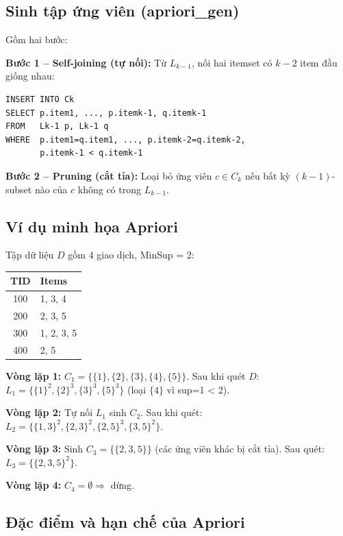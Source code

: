 \documentclass[10pt]{article}
\begin{document}
\subsection{Sinh tập ứng viên (apriori\_gen)}

Gồm hai bước:

\textbf{Bước 1 -- Self-joining (tự nối):} Từ $L_{k-1}$, nối hai itemset có $k-2$ item đầu giống nhau:
\begin{singlespace}
\begin{verbatim}
INSERT INTO Ck
SELECT p.item1, ..., p.itemk-1, q.itemk-1
FROM   Lk-1 p, Lk-1 q
WHERE  p.item1=q.item1, ..., p.itemk-2=q.itemk-2,
       p.itemk-1 < q.itemk-1
\end{verbatim}
\end{singlespace}

\textbf{Bước 2 -- Pruning (cắt tỉa):} Loại bỏ ứng viên $c \in C_k$ nếu bất kỳ $(k-1)$-subset nào của $c$ không có trong $L_{k-1}$.

\subsection{Ví dụ minh họa Apriori}

Tập dữ liệu $D$ gồm 4 giao dịch, MinSup = 2:

\begin{singlespace}
\begin{longtable}{|c|l|}
\hline
\textbf{TID} & \textbf{Items} \\
\hline
\endhead
100 & 1, 3, 4 \\
\hline
200 & 2, 3, 5 \\
\hline
300 & 1, 2, 3, 5 \\
\hline
400 & 2, 5 \\
\hline
\end{longtable}
\end{singlespace}

\textbf{Vòng lặp 1:} $C_1 = \{\{1\},\{2\},\{3\},\{4\},\{5\}\}$. Sau khi quét $D$: $L_1 = \{\{1\}^2, \{2\}^3, \{3\}^3, \{5\}^3\}$ (loại $\{4\}$ vì sup=1 < 2).

\textbf{Vòng lặp 2:} Tự nối $L_1$ sinh $C_2$. Sau khi quét: $L_2 = \{\{1,3\}^2, \{2,3\}^2, \{2,5\}^3, \{3,5\}^2\}$.

\textbf{Vòng lặp 3:} Sinh $C_3 = \{\{2,3,5\}\}$ (các ứng viên khác bị cắt tỉa). Sau quét: $L_3 = \{\{2,3,5\}^2\}$.

\textbf{Vòng lặp 4:} $C_4 = \emptyset \Rightarrow$ dừng.

\subsection{Đặc điểm và hạn chế của Apriori}
\end{document}
